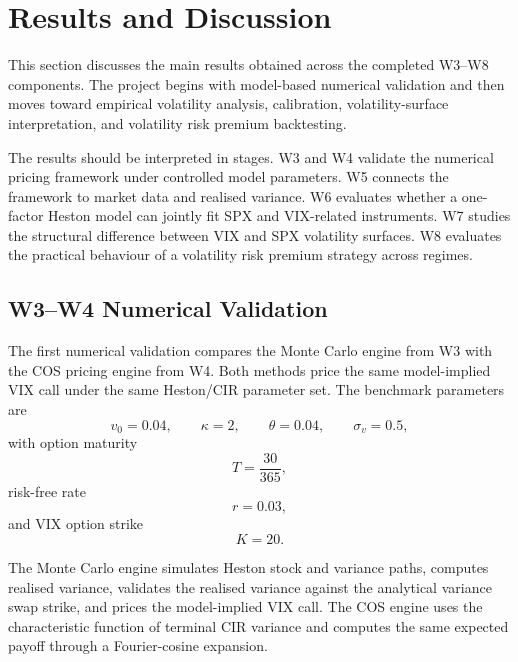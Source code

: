 \section{Results and Discussion}
\label{sec:results_discussion}

This section discusses the main results obtained across the completed W3--W8 components. The project begins with model-based numerical validation and then moves toward empirical volatility analysis, calibration, volatility-surface interpretation, and volatility risk premium backtesting.

The results should be interpreted in stages. W3 and W4 validate the numerical pricing framework under controlled model parameters. W5 connects the framework to market data and realised variance. W6 evaluates whether a one-factor Heston model can jointly fit SPX and VIX-related instruments. W7 studies the structural difference between VIX and SPX volatility surfaces. W8 evaluates the practical behaviour of a volatility risk premium strategy across regimes.

\subsection{W3--W4 Numerical Validation}

The first numerical validation compares the Monte Carlo engine from W3 with the COS pricing engine from W4. Both methods price the same model-implied VIX call under the same Heston/CIR parameter set. The benchmark parameters are
\begin{equation}
v_0=0.04,\qquad
\kappa=2,\qquad
\theta=0.04,\qquad
\sigma_v=0.5,
\end{equation}
with option maturity
\begin{equation}
T=\frac{30}{365},
\end{equation}
risk-free rate
\begin{equation}
r=0.03,
\end{equation}
and VIX option strike
\begin{equation}
K=20.
\end{equation}

The Monte Carlo engine simulates Heston stock and variance paths, computes realised variance, validates the realised variance against the analytical variance swap strike, and prices the model-implied VIX call. The COS engine uses the characteristic function of terminal CIR variance and computes the same expected payoff through a Fourier-cosine expansion.

